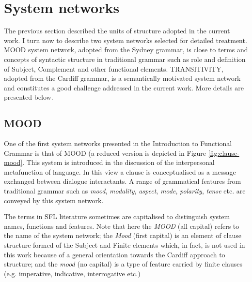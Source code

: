 \section{System networks}
    The previous section described the units of structure adopted in the current work. I turn now to describe two system networks selected for detailed treatment. MOOD system network, adopted from the Sydney grammar, is close to terms and concepts of syntactic structure in traditional grammar such as role and definition of Subject, Complement and other functional elements. %
    TRANSITIVITY, adopted from the Cardiff grammar, is a semantically motivated system network and constitutes a good challenge addressed in the current work. More details are presented below.

    
    
\subsection{MOOD}
\label{sec:mood}

    One of the first system networks presented in the Introduction to Functional Grammar \citep{Halliday2013} is that of MOOD (a reduced version is depicted in Figure \ref{fig:clause-mood}. 
    This system is introduced in the discussion of the interpersonal metafunction of language. In this view a clause is conceptualised as a message exchanged between dialogue interactants. A range of grammatical features from traditional grammar such as \textit{mood}, \textit{modality}, \textit{aspect}, \textit{mode}, \textit{polarity}, \textit{tense} etc. are conveyed by this system network. 
    
    The terms in SFL literature sometimes are capitalised to distinguish system names, functions and features. Note that here the \textit{MOOD} (all capital) refers to the name of the system network; the \textit{Mood} (first capital) is an element of clause structure formed of the Subject and Finite elements which, in fact, is not used in this work because of a general orientation towards the Cardiff approach to structure; and the \textit{mood} (no capital) is a type of feature carried by finite clauses (e.g. imperative, indicative, interrogative etc.)

